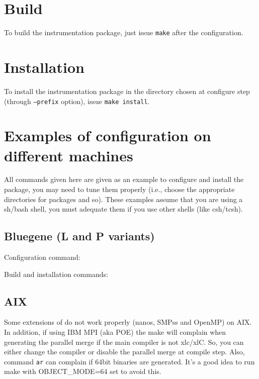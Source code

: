 \section{Build}

To build the instrumentation package, just issue {\tt make} after the configuration.

\section{Installation}

To install the instrumentation package in the directory chosen at configure step (through {\tt --prefix} option), issue {\tt make install}.

\section{Examples of configuration on different machines}

All commands given here are given as an example to configure and install the package, you may need to tune them properly (i.e., choose the appropriate directories for packages and so).  These examples assume that you are using a sh/bash shell, you must adequate them if you use other shells (like csh/tcsh).

\subsection{Bluegene (L and P variants)}

Configuration command:



Build and installation commands:


\subsection{AIX}

Some extensions of \TRACE do not work properly (nanos, SMPss and OpenMP) on AIX. In addition, if using IBM MPI (aka POE) the make will complain when generating the parallel merge if the main compiler is not xlc/xlC. So, you can either change the compiler or disable the parallel merge at compile step. Also, command {\tt ar} can complain if 64bit binaries are generated. It's a good idea to run make with OBJECT\_MODE=64 set to avoid this.

